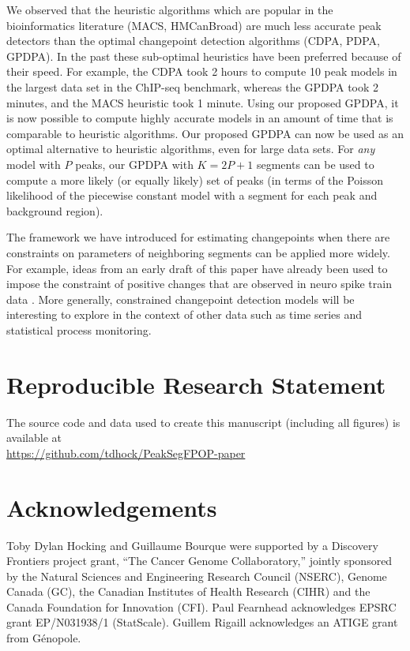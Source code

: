 \documentclass[twoside,11pt]{article}
\begin{document}
We observed that the heuristic algorithms which are popular in the
bioinformatics literature (MACS, HMCanBroad) are much less accurate peak detectors
than the optimal changepoint detection algorithms (CDPA, PDPA,
GPDPA). In the past these sub-optimal heuristics have been preferred
because of their speed. For example, the CDPA took 2 hours to compute
10 peak models in the largest data set in the ChIP-seq benchmark,
whereas the GPDPA took 2 minutes, and the MACS heuristic took 1
minute. Using our proposed GPDPA, it is now possible to compute highly
accurate models in an amount of time that is comparable to heuristic
algorithms. Our proposed GPDPA can now be used as an optimal
alternative to heuristic algorithms, even for large data sets. 
For \emph{any} model with $P$ peaks, our GPDPA with $K=2P+1$ segments can be used to compute 
a more likely (or equally likely) set of peaks (in terms of the Poisson likelihood 
of the piecewise constant model with a segment for each peak and background region).

The framework we have introduced for estimating changepoints when
there are constraints on parameters of neighboring segments can be
applied more widely. For example, ideas from an early draft of this
paper \citep{Hocking-constrained-changepoint-detection} have already
been used to impose the constraint of positive changes that are
observed in neuro spike train data \citep{Jewell2018}. More generally,
constrained changepoint detection models will be interesting to
explore in the context of other data such as time series and
statistical process monitoring.
 
\section{Reproducible Research Statement}

The source code and data used to create this manuscript (including all
figures) is available at\\
\url{https://github.com/tdhock/PeakSegFPOP-paper}


\section{Acknowledgements}
  
Toby Dylan Hocking and Guillaume Bourque were supported by a Discovery
Frontiers project grant, ``The Cancer Genome Collaboratory,'' jointly
sponsored by the Natural Sciences and Engineering Research Council
(NSERC), Genome Canada (GC), the Canadian Institutes of Health
Research (CIHR) and the Canada Foundation for Innovation (CFI). Paul
Fearnhead acknowledges EPSRC grant EP/N031938/1 (StatScale).
Guillem Rigaill acknowledges an ATIGE grant from G\'enopole.
\end{document}
